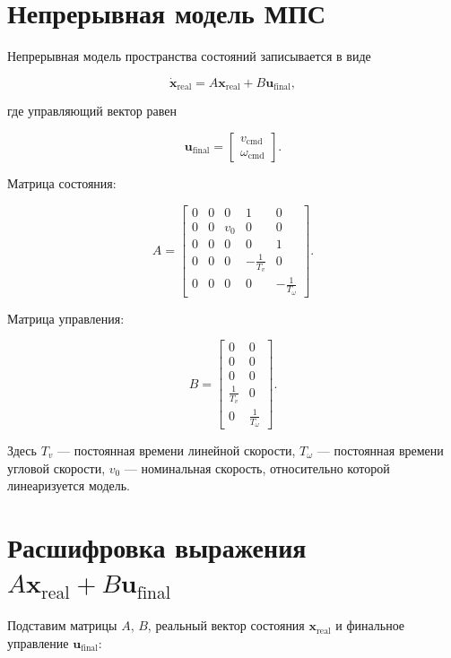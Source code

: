 \documentclass[12pt,a4paper]{article}
\newcommand{\vect}[1]{\mathbf{#1}}
\begin{document}
\section{Непрерывная модель МПС}

Непрерывная модель пространства состояний записывается в виде

\[
\dot{\vect{x}}_{\mathrm{real}} = A\vect{x}_{\mathrm{real}} + B\vect{u}_{\mathrm{final}},
\]

где управляющий вектор равен

\[
\vect{u}_{\mathrm{final}}
=
\begin{bmatrix}
v_{\mathrm{cmd}} \\
\omega_{\mathrm{cmd}}
\end{bmatrix}.
\]

Матрица состояния:

\[
A =
\begin{bmatrix}
0 & 0 & 0 & 1 & 0 \\
0 & 0 & v_0 & 0 & 0 \\
0 & 0 & 0 & 0 & 1 \\
0 & 0 & 0 & -\frac{1}{T_v} & 0 \\
0 & 0 & 0 & 0 & -\frac{1}{T_\omega}
\end{bmatrix}.
\]

Матрица управления:

\[
B =
\begin{bmatrix}
0 & 0 \\
0 & 0 \\
0 & 0 \\
\frac{1}{T_v} & 0 \\
0 & \frac{1}{T_\omega}
\end{bmatrix}.
\]

Здесь \(T_v\) — постоянная времени линейной скорости,
\(T_\omega\) — постоянная времени угловой скорости,
\(v_0\) — номинальная скорость, относительно которой линеаризуется модель.

\section{Расшифровка выражения
\texorpdfstring{\(A\vect{x}_{\mathrm{real}} + B\vect{u}_{\mathrm{final}}\)}
{A x real + B u final}}

Подставим матрицы \(A\), \(B\), реальный вектор состояния
\(\vect{x}_{\mathrm{real}}\) и финальное управление
\(\vect{u}_{\mathrm{final}}\):
\end{document}
